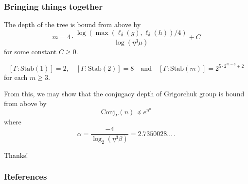 \documentclass[aspectratio=169,10pt]{beamer}
\renewcommand{\geq}{\geqslant}
\newcommand\Grig{{\Gamma}}
\newcommand\Conj{\mathrm{Conj}}
\begin{document}
\begin{frame}[t]
	\frametitle{Bringing things together}


	\begin{lemma}
		The depth of the tree is bound from above by
			{\large\[
					m=
					4\cdot \frac{\log\left(\max(\ell_\delta(g), \ell_\delta(h))/4\right)}{\log(\eta^3\mu)}+C
				\]}
		for some constant $C\geq 0$.
	\end{lemma}

	\begin{lemma}[recall]%
		\vspace{-1ex}
		\[
			[\Grig:\mathrm{Stab}(1)] = 2,\quad
			[\Grig:\mathrm{Stab}(2)] = 8\quad\text{and}\quad
			[\Grig:\mathrm{Stab}(m)] = 2^{5\cdot 2^{m-3}+2}
		\]
		for each $m \geq 3$.\nocite{harpe2000}
	\end{lemma}

	\pause

	From this, we may show that the conjugacy depth of Grigorchuk group is bound from above by
		{\large\[
				\Conj_\Grig(n)
				\preccurlyeq
				e^{n^{\alpha}}
			\]}
	where
		{\large\[
				\alpha
				=
				\frac{-4}{\displaystyle \log_2\left(\eta^3 \beta \right)}
				=
				2.7350028...\,.
			\]}

\end{frame}


\begin{frame}%
	\centering\Huge{Thanks!}
\end{frame}

\begin{frame}[t,allowframebreaks]
	\frametitle{References}
	\printbibliography[heading=none]
\end{frame}
\end{document}
